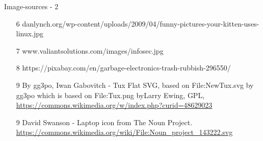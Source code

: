 \begin{frame}{Image-sources - 2}
\begin{itemize}
	\item [6] danlynch.org/wp-content/uploads/2009/04/funny-pictures-your-kitten-uses-linux.jpg
	\item [7] www.valiantsolutions.com/images/infosec.jpg
	\item [8] https://pixabay.com/en/garbage-electronics-trash-rubbish-296550/
	\item [9] By gg3po, Iwan Gabovitch - Tux Flat SVG, based on File:NewTux.svg by gg3po which is based on File:Tux.png byLarry Ewing, GPL, \url{https://commons.wikimedia.org/w/index.php?curid=48629023}
	\item [9] David Swanson - Laptop icon from The Noun Project. \url{https://commons.wikimedia.org/wiki/File:Noun_project_143222.svg}
\end{itemize}
\end{frame}
